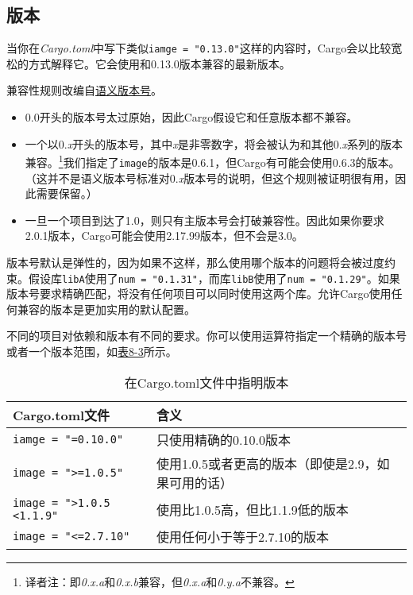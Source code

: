 \subsection{版本}
当你在\emph{Cargo.toml}中写下类似\texttt{iamge = "0.13.0"}这样的内容时，Cargo会以比较宽松的方式解释它。它会使用和0.13.0版本兼容的最新版本。

兼容性规则改编自\href{https://semver.org/}{语义版本号}。

\begin{itemize}
    \item 0.0开头的版本号太过原始，因此Cargo假设它和任意版本都不兼容。
    \item 一个以0.\emph{x}开头的版本号，其中\emph{x}是非零数字，将会被认为和其他0.\emph{x}系列的版本兼容。\footnote{译者注：即\emph{0.x.a}和\emph{0.x.b}兼容，但\emph{0.x.a}和\emph{0.y.a}不兼容。}我们指定了\texttt{image}的版本是0.6.1，但Cargo有可能会使用0.6.3的版本。（这并不是语义版本号标准对0.\emph{x}版本号的说明，但这个规则被证明很有用，因此需要保留。）
    \item 一旦一个项目到达了1.0，则只有主版本号会打破兼容性。因此如果你要求2.0.1版本，Cargo可能会使用2.17.99版本，但不会是3.0。
\end{itemize}

版本号默认是弹性的，因为如果不这样，那么使用哪个版本的问题将会被过度约束。假设库\texttt{libA}使用了\texttt{num = "0.1.31"}，而库\texttt{libB}使用了\texttt{num = "0.1.29"}。如果版本号要求精确匹配，将没有任何项目可以同时使用这两个库。允许Cargo使用任何兼容的版本是更加实用的默认配置。

不同的项目对依赖和版本有不同的要求。你可以使用运算符指定一个精确的版本号或者一个版本范围，如\hyperref[t8-3]{表8-3}所示。

\begin{table}[htbp]
    \centering
    \caption{在Cargo.toml文件中指明版本}
    \label{t8-3}
    \begin{tabular}{p{}p{}}
        \hline
        \textbf{Cargo.toml文件} & \textbf{含义} \\
        \hline
        \texttt{iamge = "=0.10.0"}  & 只使用精确的0.10.0版本 \\
        \rowcolor{tablecolor}
        \texttt{image = ">=1.0.5"}  & 使用1.0.5或者更高的版本（即使是2.9，如果可用的话） \\
        \texttt{image = ">1.0.5 <1.1.9"} & 使用比1.0.5高，但比1.1.9低的版本 \\
        \rowcolor{tablecolor}
        \texttt{image = "<=2.7.10"} & 使用任何小于等于2.7.10的版本 \\
    \end{tabular}
\end{table}

